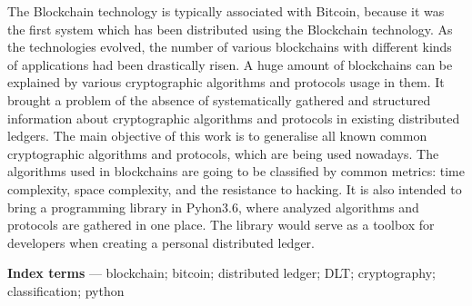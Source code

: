 The Blockchain technology is typically associated with Bitcoin, because it was
the first system which has been distributed using the Blockchain technology.
As the technologies evolved, the number of various blockchains with different
kinds of applications had been drastically risen. A huge amount of blockchains
can be explained by various cryptographic algorithms and protocols usage in
them. It brought a problem of the absence of systematically gathered and
structured information about cryptographic algorithms and protocols in existing
distributed ledgers. The main objective of this work is to generalise all known
common cryptographic algorithms and protocols, which are being used nowadays.
The algorithms used in blockchains are going to be classified by common
metrics: time complexity, space complexity, and the resistance to hacking. It
is also intended to bring a programming library in Pyhon3.6, where analyzed
algorithms and protocols are gathered in one place. The library would serve as
a toolbox for developers when creating a personal distributed ledger.

\textbf{Index terms} --- blockchain; bitcoin; distributed ledger; DLT;
cryptography; classification; python
